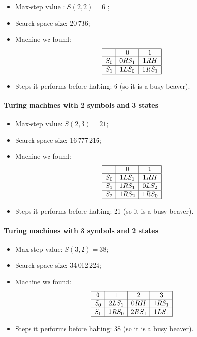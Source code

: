 \documentclass{report}
\begin{document}
\begin{itemize}
\item Max-step value \cite{rado}: $S(2,2) = 6$ ;
\item Search space size: 20\,736;
\item Machine we found:
\[
\begin{array}[h]{|c|c|c|}
\hline
   &0     &1\\
\hline
S_0& 0RS_1& 1RH\\
\hline
S_1& 1LS_0& 1RS_1\\
\hline
\end{array}
\]
\item Steps it performs before halting: 6 (so it is a busy beaver).
\end{itemize}

\paragraph{Turing machines with 2 symbols and 3 states}

\begin{itemize}
\item Max-step value: $S(2,3) = 21$;
\item Search space size: 16\,777\,216;
\item Machine we found:
\[
\begin{array}[h]{|c|c|c|c|}
\hline
   & 0    &1\\
\hline
S_0& 1LS_1& 1RH\\
\hline
S_1& 1RS_1& 0LS_2\\
\hline
S_2& 1RS_2& 1RS_0\\
\hline
\end{array}
\]
\item Steps it performs before halting: 21 (so it is a busy beaver).
\end{itemize}


\paragraph{Turing machines with 3 symbols and 2 states}

\begin{itemize}
\item Max-step value: $S(3,2) = 38$;
\item Search space size: 34\,012\,224;
\item Machine we found:
\[
\begin{array}[h]{|c|c|c|c|c|}
\hline
0&   1&   2& 3\\
\hline
S_0& 2LS_1& 0RH& 1RS_1\\
\hline
S_1& 1RS_0& 2RS_1& 1LS_1\\
\hline
\end{array}
\]
\item Steps it performs before halting: 38 (so it is a busy beaver).
\end{itemize}
\end{document}
